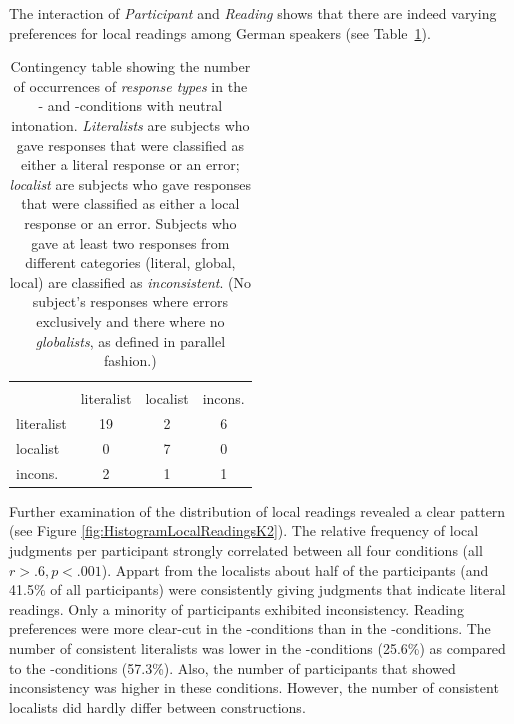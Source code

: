 \documentclass[fleqn,reqno,10pt,draft]{article}
\newcommand{\as}{\acro{as}}
\renewcommand{\es}{\acro{es}}
\begin{document}
The interaction of {\it Participant} and {\it Reading} shows that
there are indeed varying preferences for local readings among German
speakers (see Table~\ref{table:answer-types-as}).
%
\begin{table}[t]
  \centering
      \begin{tabular}{lccc}
      & \multicolumn{3}{c}{\es} \\ \cmidrule(r){2-4}
      \as & literalist & localist & incons. \\ \midrule
      literalist   & 19 & 2 & 6\\
      localist     &  0 & 7 & 0 \\
      incons. &  2 & 1 & 1\\
    \end{tabular}
    \caption{Contingency table showing the number of occurrences of
      \emph{response types} in the \as- and \es-conditions with
      neutral intonation. \emph{Literalists} are subjects who gave
      responses that were classified as either a literal response or
      an error; \emph{localist} are subjects who gave responses
      that were classified as either a 
      local response or an error. Subjects who gave at least two
      responses from different categories (literal, global, local) are
      classified as \emph{inconsistent}. (No subject's responses where
      errors exclusively and there where no \emph{globalists}, as
      defined in parallel fashion.)}
    \label{table:answer-types-as}
\end{table}
%
Further examination of the distribution of local readings revealed a
clear pattern (see Figure \ref{fig:HistogramLocalReadingsK2}). The
relative frequency of local judgments per participant strongly
correlated between all four conditions (all $r>.6, p<.001$). Appart
from the localists about half of the participants (and 41.5\% of all
participants) were consistently giving judgments that indicate literal
readings. Only a minority of participants exhibited
inconsistency. Reading preferences were more clear-cut in the
\as-conditions than in the \es-conditions. The number of consistent
literalists was lower in the \es-conditions (25.6\%) as compared to
the \as-conditions (57.3\%). Also, the number of participants that
showed inconsistency was higher in these conditions. However, the
number of consistent localists did hardly differ between
constructions.
\end{document}
